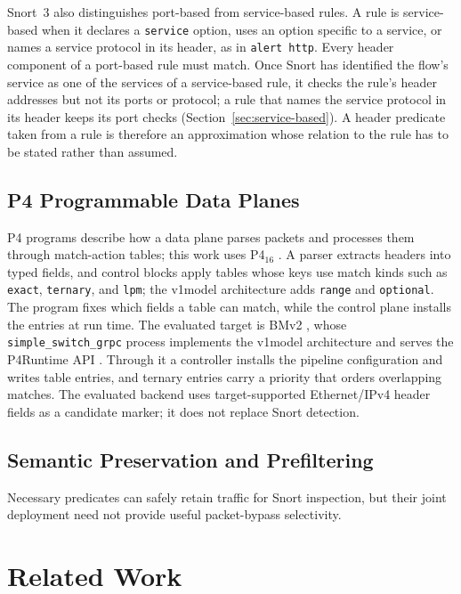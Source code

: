 \documentclass{article}
\begin{document}
Snort~3 also distinguishes port-based from service-based rules. A rule is
service-based when it declares a \texttt{service} option, uses an option
specific to a service, or names a service protocol in its header, as in
\texttt{alert http}. Every header component of a port-based rule must match.
Once Snort has identified the flow's service as one of the services of a
service-based rule, it checks the rule's header addresses but not its ports
or protocol; a rule that names the service protocol in its
header keeps its port checks (Section~\ref{sec:service-based}). A header predicate taken from a rule is
therefore an approximation whose relation to the rule has to be stated rather
than assumed.

\subsection{P4 Programmable Data Planes}
P4 \cite{bosshart2014p4} programs describe how a data plane parses packets and
processes them through match-action tables; this work uses
P4$_{16}$ \cite{p4spec2023}. A parser extracts headers into typed fields, and
control blocks apply tables whose keys use match kinds such as
\texttt{exact}, \texttt{ternary}, and \texttt{lpm}; the v1model architecture
adds \texttt{range} and \texttt{optional}. The program fixes which fields a
table can match, while the control plane installs the entries at run time.
The evaluated target is BMv2 \cite{bmv2}, whose \texttt{simple\_switch\_grpc}
process implements the v1model architecture and serves the P4Runtime
API \cite{p4runtime2024}. Through it a controller installs the pipeline
configuration and writes table entries, and ternary entries carry a priority
that orders overlapping matches. The evaluated backend uses target-supported
Ethernet/IPv4 header fields as a candidate marker; it does not replace Snort
detection.

\subsection{Semantic Preservation and Prefiltering}
Necessary predicates can safely retain traffic for Snort inspection, but
their joint deployment need not provide useful packet-bypass selectivity.

\section{Related Work}
\label{sec:related}
\end{document}
